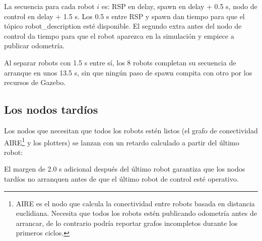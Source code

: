 

La secuencia para cada robot $i$ es: RSP en delay, spawn en delay + 0.5 s, nodo de control en delay + 1.5 s. Los 0.5 s entre RSP y spawn dan tiempo para que el tópico robot\_description esté disponible. El segundo extra antes del nodo de control da tiempo para que el robot aparezca en la simulación y empiece a publicar odometría.

Al separar robots con 1.5 s entre sí, los 8 robots completan su secuencia de arranque en unos 13.5 s, sin que ningún paso de spawn compita con otro por los recursos de Gazebo.

\subsection{Los nodos tardíos}

Los nodos que necesitan que todos los robots estén listos (el grafo de conectividad AIRE\footnote{AIRE es el nodo que calcula la conectividad entre robots basada en distancia euclidiana. Necesita que todos los robots estén publicando odometría antes de arrancar, de lo contrario podría reportar grafos incompletos durante los primeros ciclos.} y los plotters) se lanzan con un retardo calculado a partir del último robot:



El margen de 2.0 s adicional después del último robot garantiza que los nodos tardíos no arranquen antes de que el último robot de control esté operativo.
